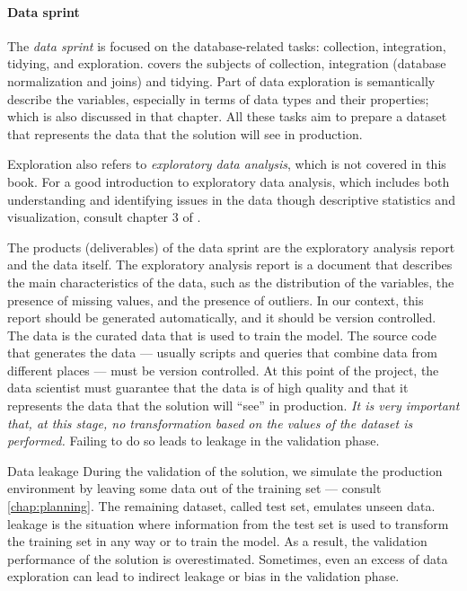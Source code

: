 \paragraph{Data sprint}
The \emph{data sprint} is focused on the database-related tasks: collection, integration, tidying, and
exploration.   covers the subjects of collection, integration (database
normalization and joins) and tidying.  Part of data exploration is semantically describe
the variables, especially in terms of data types and their properties; which is also
discussed in that chapter.  All these tasks aim to prepare a dataset that represents
the data that the solution will see in production.

Exploration also refers to \emph{exploratory
data analysis}, which is not covered in this book. %
For a good introduction to exploratory data analysis, which includes both understanding
and identifying issues in the data though descriptive statistics and visualization, consult chapter 3 of
\textcite{Zumel2019}.

The products (deliverables) of the data sprint are the exploratory analysis report and the
data itself.  The exploratory analysis report is a document that describes the main
characteristics of the data, such as the distribution of the variables, the presence of
missing values, and the presence of outliers.  In our context, this report should be
generated automatically, and it should be version controlled.  The data is the curated
data that is used to train the model.  The source code that generates the data ---
usually scripts and queries that combine data from different places --- must be version
controlled.  At this point of the project, the data scientist must guarantee that the data
is of high quality and that it represents the data that the solution will ``see'' in
production.  \emph{It is very important that, at this stage, no transformation based
on the values of the dataset is performed.}  Failing to do so leads to \gls{leakage} in
the validation phase.

\begin{defbox}{Data leakage}{}
  During the validation of the solution, we simulate the production environment by leaving
  some data out of the training set --- consult \cref{chap:planning}.  The remaining
  dataset, called test set, emulates unseen data.  \Gls{leakage} is the situation where
  information from the test set is used to transform the training set in any way or to
  train the model.  As a result, the validation performance of the solution is
  overestimated.  Sometimes, even an excess of data exploration can lead to indirect
  leakage or bias in the validation phase.
\end{defbox}

